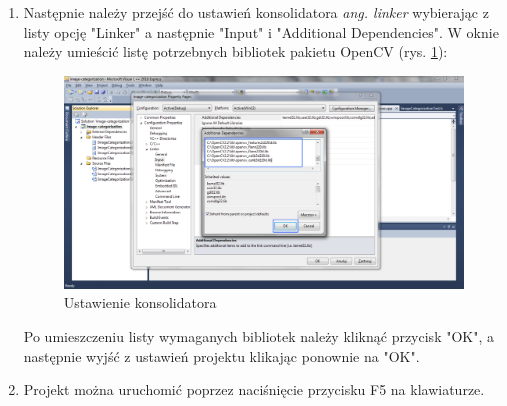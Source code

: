 \begin{enumerate}
	\item Następnie należy przejść do ustawień konsolidatora \emph{ang. linker} wybierając z listy opcję "Linker" a następnie "Input" i "Additional Dependencies". W oknie należy umieścić listę potrzebnych bibliotek pakietu OpenCV (rys. \ref{fig:ustawienia-linker}):
	
		
		\begin{figure}[h]
			\centering
			\includegraphics[scale=0.4]{graphics/03_implementacja/ustawienia-linker.pdf}
			\caption{ Ustawienie konsolidatora }
			\label{fig:ustawienia-linker}
		\end{figure}
	
	Po umieszczeniu listy wymaganych bibliotek należy kliknąć przycisk "OK", a następnie wyjść z ustawień projektu klikając ponownie na "OK".
	
	\item Projekt można uruchomić poprzez naciśnięcie przycisku F5 na klawiaturze.
\end{enumerate}

